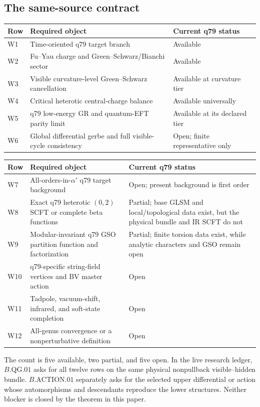 \documentclass[11pt]{article}
\newcommand{\alphap}{\alpha'}
\begin{document}
\subsection{The same-source contract}

\begin{center}
\small
\begin{tabularx}{\textwidth}{@{}L{0.07\textwidth}X L{0.27\textwidth}@{}}
\toprule
Row & Required object & Current q79 status\\
\midrule
W1 & Time-oriented q79 target branch & Available\\
W2 & Fu--Yau charge and Green--Schwarz/Bianchi sector & Available\\
W3 & Visible curvature-level Green--Schwarz cancellation & Available at
curvature tier\\
W4 & Critical heterotic central-charge balance & Available universally\\
W5 & q79 low-energy GR and quantum-EFT parity limit & Available at its
declared tier\\
W6 & Global differential gerbe and full visible-cycle consistency & Open;
finite representative only\\
\bottomrule
\end{tabularx}

\medskip
\begin{tabularx}{\textwidth}{@{}L{0.07\textwidth}X L{0.27\textwidth}@{}}
\toprule
Row & Required object & Current q79 status\\
\midrule
W7 & All-orders-in-\(\alphap\) q79 target background & Open; present
background is first order\\
W8 & Exact q79 heterotic \((0,2)\) SCFT or complete beta functions &
Partial; base GLSM and local/topological data exist, but the physical bundle
and IR SCFT do not\\
W9 & Modular-invariant q79 GSO partition function and factorization &
Partial; finite torsion data exist, while analytic characters and GSO remain
open\\
W10 & q79-specific string-field vertices and BV master action & Open\\
W11 & Tadpole, vacuum-shift, infrared, and soft-state completion & Open\\
W12 & All-genus convergence or a nonperturbative definition & Open\\
\bottomrule
\end{tabularx}
\end{center}

The count is five available, two partial, and five open.  In the live
research ledger, \(B.\mathrm{QG}.01\) asks for all twelve rows on the same
physical nonpullback visible--hidden bundle.  \(B.\mathrm{ACTION}.01\)
separately asks for the selected upper differential or action whose
automorphisms and descendants reproduce the lower structures.  Neither
blocker is closed by the theorem in this paper.
\end{document}
